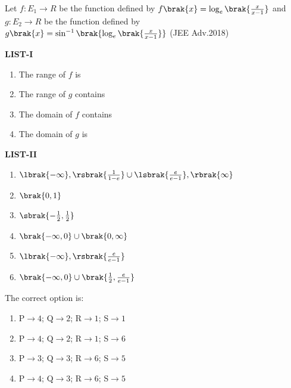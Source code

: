 			Let $f:E_1\to R$ be the function defined by $f\brak{x}=\log_e\brak{\frac{x}{x-1}}$ and $g:E_2\to R$ be the function defined by $g\brak{x}=\sin^{-1}\brak{\log_e\brak{\frac{x}{x-1}}}$
			\hfill(JEE Adv.2018)
\begin{multicols}{2}
	\textbf{LIST-I}
	\begin{enumerate}[label=(\Alph*), start=16]
	\item The range of $f$ is
	\item The range of $g$ contains
	\item The domain of $f$ contains
	\item The domain of $g$ is
	\end{enumerate}
\columnbreak
	\textbf{LIST-II}
\begin{enumerate}
	\item $\lbrak{-\infty},\rsbrak{\frac{1}{1-e}}\cup\lsbrak{\frac{e}{e-1}},\rbrak{\infty}$
	\item $\brak{0,1}$
	\item $\sbrak{-\frac{1}{2},\frac{1}{2}}$
	\item $\brak{-\infty,0}\cup\brak{0,\infty}$
	\item $\lbrak{-\infty},\rsbrak{\frac{e}{e-1}}$
	\item $\brak{-\infty,0}\cup\brak{\frac{1}{2},\frac{e}{e-1}}$
\end{enumerate}
\end{multicols}
The correct option is:
		\begin{enumerate}
		\item P$\to4$; Q$\to2$; R$\to1$; S$\to1$
		\item P$\to4$; Q$\to2$; R$\to1$; S$\to6$
		\item P$\to3$; Q$\to3$; R$\to6$; S$\to5$
		\item P$\to4$; Q$\to3$; R$\to6$; S$\to5$
		\end{enumerate}
